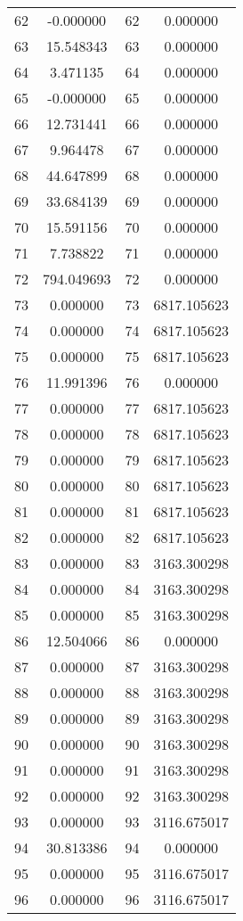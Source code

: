 \documentclass[12pt]{article}
\begin{document}
\begin{longtable}{@{}cccc@{}}
62 & -0.000000 & 62 & 0.000000 \\
63 & 15.548343 & 63 & 0.000000 \\
64 & 3.471135 & 64 & 0.000000 \\
65 & -0.000000 & 65 & 0.000000 \\
66 & 12.731441 & 66 & 0.000000 \\
67 & 9.964478 & 67 & 0.000000 \\
68 & 44.647899 & 68 & 0.000000 \\
69 & 33.684139 & 69 & 0.000000 \\
70 & 15.591156 & 70 & 0.000000 \\
71 & 7.738822 & 71 & 0.000000 \\
72 & 794.049693 & 72 & 0.000000 \\
73 & 0.000000 & 73 & 6817.105623 \\
74 & 0.000000 & 74 & 6817.105623 \\
75 & 0.000000 & 75 & 6817.105623 \\
76 & 11.991396 & 76 & 0.000000 \\
77 & 0.000000 & 77 & 6817.105623 \\
78 & 0.000000 & 78 & 6817.105623 \\
79 & 0.000000 & 79 & 6817.105623 \\
80 & 0.000000 & 80 & 6817.105623 \\
81 & 0.000000 & 81 & 6817.105623 \\
82 & 0.000000 & 82 & 6817.105623 \\
83 & 0.000000 & 83 & 3163.300298 \\
84 & 0.000000 & 84 & 3163.300298 \\
85 & 0.000000 & 85 & 3163.300298 \\
86 & 12.504066 & 86 & 0.000000 \\
87 & 0.000000 & 87 & 3163.300298 \\
88 & 0.000000 & 88 & 3163.300298 \\
89 & 0.000000 & 89 & 3163.300298 \\
90 & 0.000000 & 90 & 3163.300298 \\
91 & 0.000000 & 91 & 3163.300298 \\
92 & 0.000000 & 92 & 3163.300298 \\
93 & 0.000000 & 93 & 3116.675017 \\
94 & 30.813386 & 94 & 0.000000 \\
95 & 0.000000 & 95 & 3116.675017 \\
96 & 0.000000 & 96 & 3116.675017 \\

\end{longtable}
\end{document}
